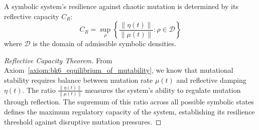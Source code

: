 \begin{corollary}
\label{corollary:bk6_reflective_capacity_theorem}
A symbolic system's resilience against chaotic mutation is determined by its reflective capacity $C_R$:
\begin{equation}
C_R = \sup_{\rho} \left\{\frac{\|\eta(t)\|}{\|\mu(t)\|} : \rho \in \mathcal{D}\right\}
\end{equation}
where $\mathcal{D}$ is the domain of admissible symbolic densities.
\begin{proof}[Reflective Capacity Theorem]
\label{proof:bk6_reflective_capacity_theorem}
From Axiom~\ref{axiom:bk6_equilibrium_of_mutability}, we know that mutational stability requires balance between mutation rate $\mu(t)$ and reflective damping $\eta(t)$. The ratio $\frac{\|\eta(t)\|}{\|\mu(t)\|}$ measures the system's ability to regulate mutation through reflection. The supremum of this ratio across all possible symbolic states defines the maximum regulatory capacity of the system, establishing its resilience threshold against disruptive mutation pressures.
\end{proof}
\end{corollary}
